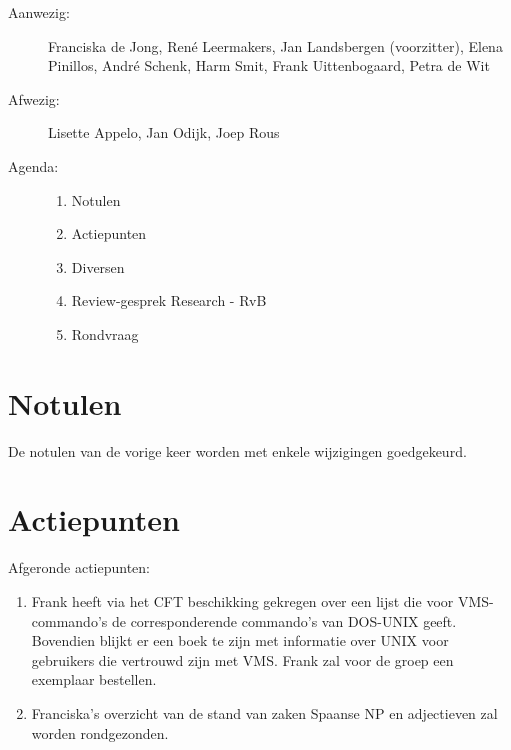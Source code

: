 
   \RosSupersedes{-}
   \MakeRosTitle
%
%
\begin{description}
\item[Aanwezig:] Franciska de Jong, Ren\'{e} Leermakers,  
                 Jan Landsbergen (voorzitter),   
                 Elena Pinillos, 
                 Andr\'{e} Schenk,
                 Harm Smit,
                 Frank Uittenbogaard, Petra de Wit
                  
                  

\item[Afwezig:]  Lisette Appelo,
                 Jan Odijk, 
                 Joep Rous

\item[Agenda:]\mbox{}
  \begin{enumerate}
  \item Notulen
  \item Actiepunten
  \item Diversen
  \item Review-gesprek Research - RvB
  \item Rondvraag
  \end{enumerate}
\end{description}

\section{Notulen}
De notulen van de vorige keer worden met enkele wijzigingen goedgekeurd.

\section{Actiepunten}

Afgeronde actiepunten:
\begin{enumerate}
  \item Frank heeft via het CFT beschikking gekregen over een lijst 
        die voor VMS-commando's de corresponderende commando's van DOS-UNIX 
        geeft. Bovendien blijkt er een boek te zijn met informatie over 
        UNIX voor gebruikers die vertrouwd zijn met VMS. Frank zal voor de 
groep een exemplaar bestellen.
  \item Franciska's overzicht van de stand van zaken Spaanse NP en adjectieven 
        zal worden rondgezonden.
\end{enumerate}

